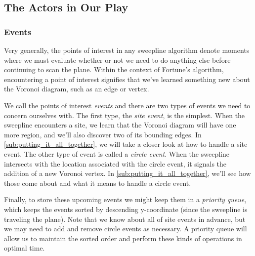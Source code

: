 \documentclass[12pt,twoside]{reedthesis}
\begin{document}
    \subsection{The Actors in Our Play} %
    \label{sub:the_actors_in_our_play}

      \subsubsection{Events} %
      \label{ssub:events}
        Very generally, the points of interest in any sweepline algorithm denote moments where we must evaluate whether or not we need to do anything else before continuing to scan the plane. Within the context of Fortune's algorithm, encountering a point of interest signifies that we've learned something new about the Voronoi diagram, such as an edge or vertex. \par

        We call the points of interest \emph{events} and there are two types of events we need to concern ourselves with. The first type, the \emph{site event}, is the simplest. When the sweepline encounters a site, we learn that the Voronoi diagram will have one more region, and we'll also discover two of its bounding edges. In \cref{sub:putting_it_all_together}, we will take a closer look at how to handle a site event. The other type of event is called a \emph{circle event}. When the sweepline intersects with the location associated with the circle event, it signals the addition of a new Voronoi vertex. In \cref{sub:putting_it_all_together}, we'll see how those come about and what it means to handle a circle event.\par

        Finally, to store these upcoming events we might keep them in a \emph{priority queue}, which keeps the events sorted by descending y-coordinate (since the sweepline is traveling  the plane). Note that we know about all of site events in advance, but we may need to add and remove circle events as necessary. A priority queue will allow us to maintain the sorted order and perform these kinds of operations in optimal time. 


\end{document}
